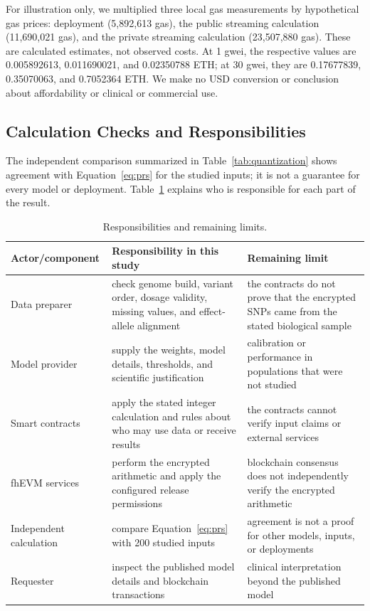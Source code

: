 \documentclass[10pt]{article}
\begin{document}
For illustration only, we multiplied three local gas measurements by hypothetical gas
prices: deployment (5,892,613 gas), the public streaming calculation (11,690,021 gas),
and the private streaming calculation (23,507,880 gas).  These are calculated estimates,
not observed costs.  At 1 gwei, the respective values are 0.005892613, 0.011690021,
and 0.02350788 ETH; at 30 gwei, they are 0.17677839, 0.35070063, and 0.7052364 ETH.
We make no USD conversion or conclusion about affordability or clinical or commercial use.

\subsection{Calculation Checks and Responsibilities}

The independent comparison summarized in Table~\ref{tab:quantization} shows agreement
with Equation~\ref{eq:prs} for the studied inputs; it is not a guarantee for every
model or deployment.  Table~\ref{tab:correctness_boundary} explains who is responsible
for each part of the result.

\begin{table}[t]
\centering
\caption{Responsibilities and remaining limits.}
\label{tab:correctness_boundary}
\small
\begin{tabularx}{\textwidth}{@{}p{3.2cm}XX@{}}
\toprule
\textbf{Actor/component} & \textbf{Responsibility in this study} & \textbf{Remaining limit} \\
\midrule
Data preparer & check genome build, variant order, dosage validity, missing values, and effect-allele alignment & the contracts do not prove that the encrypted SNPs came from the stated biological sample \\
Model provider & supply the weights, model details, thresholds, and scientific justification & calibration or performance in populations that were not studied \\
Smart contracts & apply the stated integer calculation and rules about who may use data or receive results & the contracts cannot verify input claims or external services \\
fhEVM services & perform the encrypted arithmetic and apply the configured release permissions & blockchain consensus does not independently verify the encrypted arithmetic \\
Independent calculation & compare Equation~\ref{eq:prs} with 200 studied inputs & agreement is not a proof for other models, inputs, or deployments \\
Requester & inspect the published model details and blockchain transactions & clinical interpretation beyond the published model \\
\bottomrule
\end{tabularx}
\end{table}
\end{document}
